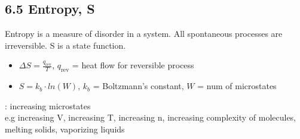 \subsection{6.5 Entropy, S}
    \vspace*{0.2em}
    Entropy is a measure of disorder in a system. All spontaneous processes are irreversible. S is a state function.
    \begin{itemize}
        \item $\Delta S = \frac{q_\text{rev}}{T}$, $q_\text{rev}$ = heat flow for reversible process
        \item $S = k_b \cdot ln(W)$, $k_b$ = Boltzmann's constant, $W$ = num of microstates
    \end{itemize}
    : increasing microstates\\
    e.g increasing V, increasing T, increasing n, increasing complexity of molecules, melting solids, vaporizing liquids